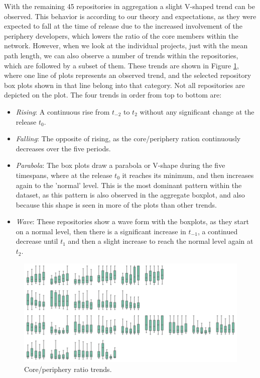 With the remaining 45 repositories in aggregation a slight V-shaped trend can be observed. This behavior is according to our theory and expectations, as they were expected to fall at the time of release due to the increased involvement of the periphery developers, which lowers the ratio of the core members within the network. However, when we look at the individual projects, just with the mean path length, we can also observe a number of trends within the repositories, which are followed by a subset of them. These trends are shown in Figure \ref{fig:cp-box-grid}, where one line of plots represents an observed trend, and the selected repository box plots shown in that line belong into that category. Not all repositories are depicted on the plot. The four trends in order from top to bottom are:

\begin{itemize}
    \item \textit{Rising}: A continuous rise from $t_{-2}$ to $t_2$ without any significant change at the release $t_0$.
    \item \textit{Falling}: The opposite of rising, as the core/periphery ration continuously decreases over the five periods.
    \item \textit{Parabola}: The box plots draw a parabola or V-shape during the five timespans, where at the release $t_0$ it reaches its minimum, and then increases again to the 'normal' level. This is the most dominant pattern within the dataset, as this pattern is also observed in the aggregate boxplot, and also because this shape is seen in more of the plots than other trends.
    \item \textit{Wave}: These repositories show a wave form with the boxplots, as they start on a normal level, then there is a significant increase in $t_{-1}$, a continued decrease until $t_1$ and then a slight increase to reach the normal level again at $t_2$.
\end{itemize}

\begin{figure}
    \centering
    \includegraphics[width=\textwidth]{figures/quantitative/boxplots/grid.png}
    \caption{Core/periphery ratio trends.}
    \label{fig:cp-box-grid}
\end{figure}


